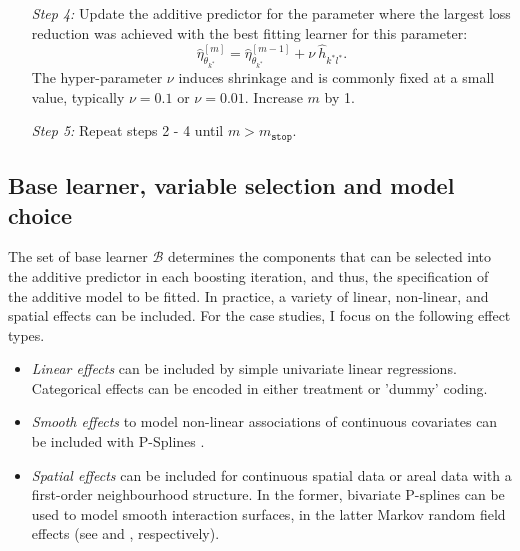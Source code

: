 \begin{algorithm}[!t]
\begin{itemize}
		\item[\textit{Step 4:}] Update the additive predictor for the parameter where the largest loss reduction was achieved with the best fitting learner for this parameter:
			\begin{equation*}
				\hat{\eta}^{[m]}_{\theta_{k^*}}=  \hat{\eta}^{[m-1]}_{\theta_{k^*}} + \nu \: \hat{h}_{k^* l^*}.
			\end{equation*}
			The hyper-parameter $\nu$ induces shrinkage and is commonly fixed at a small value, typically $\nu = 0.1$ or $\nu = 0.01$. Increase $m$ by 1. 
		
		\item[\textit{Step 5:}] Repeat steps 2 - 4 until $m > m_{\mathtt{stop}}$.
	\end{itemize}
\end{algorithm}


\subsection{Base learner, variable selection and model choice}\label{sec:base-learner-variable-selection-and-model-choice}

The set of base learner $\mathcal{B}$ determines the components that can be selected into the additive predictor in each boosting iteration, and thus, the specification of the additive model to be fitted. In practice, a variety of linear, non-linear, and spatial effects can be included. For the case studies, I focus on the following effect types.

\begin{itemize}
	\item \textit{Linear effects} can be included by simple univariate linear regressions. Categorical effects can be encoded in either treatment or 'dummy' coding.
	
	\item \textit{Smooth effects} to model non-linear associations of continuous covariates can be included with P-Splines
	\autocite{eilersFlexibleSmoothingBsplines1996, schmidBoostingAdditiveModels2008}.
	
	\item \textit{Spatial effects} can be included for continuous spatial data or areal data with a first-order neighbourhood structure. In the former, bivariate P-splines can be used to model smooth interaction surfaces, in the latter Markov random field effects (see \textcite{kneibVariableSelectionModel2009} and \textcite{sobotkaGeoadditiveExpectileRegression2012}, respectively).
\end{itemize}

